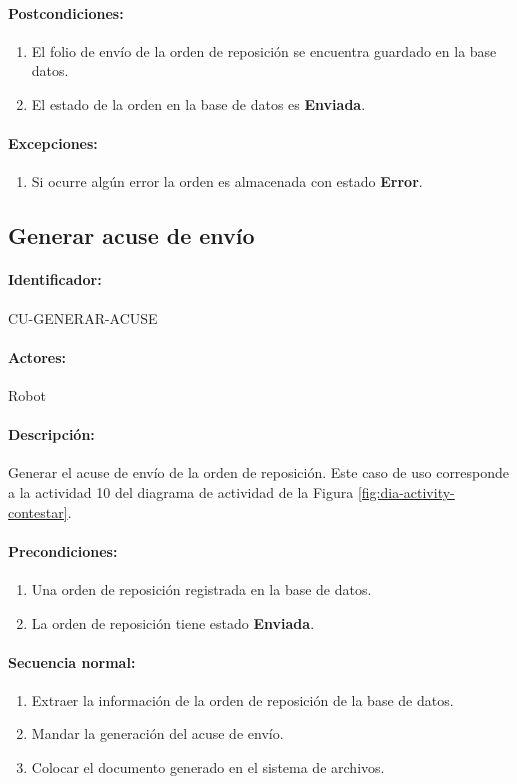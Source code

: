 \paragraph{Postcondiciones:}
\begin{enumerate}
  \item El folio de envío de la orden de reposición se encuentra guardado en la base datos.
  \item El estado de la orden en la base de datos es \textbf{Enviada}.
\end{enumerate}
\paragraph{Excepciones:}
\begin{enumerate}
  \item Si ocurre algún error la orden es almacenada con estado \textbf{Error}.
\end{enumerate}


\subsection{Generar acuse de envío}\label{cu-generar-acuse}
\paragraph{Identificador:}
CU-GENERAR-ACUSE
\paragraph{Actores:}
Robot
\paragraph{Descripción:}
Generar el acuse de envío de la orden de reposición. Este caso de uso corresponde a la actividad 10 del diagrama de actividad de la Figura \ref{fig:dia-activity-contestar}.
\paragraph{Precondiciones:}
\begin{enumerate}
  \item Una orden de reposición registrada en la base de datos.
  \item La orden de reposición tiene estado \textbf{Enviada}.
\end{enumerate}
\paragraph{Secuencia normal:}
\begin{enumerate}
  \item Extraer la información de la orden de reposición de la base de datos.
  \item Mandar la generación del acuse de envío.
  \item Colocar el documento generado en el sistema de archivos.
\end{enumerate}
